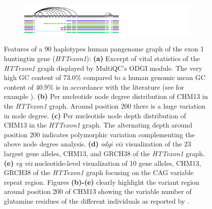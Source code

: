\begin{figure}[ht!]
\begin{subfigure}{\linewidth}
	\caption{}
	\centering
	\includegraphics[width=1.0\linewidth, trim=-0.4cm 0.1cm 3.15cm 0cm, clip]{fig/metrics/chr4_pan_HTTex1_STR_xg_svg.pdf}
	\label{fig:metrics-str}
\end{subfigure}
	\caption{Features of a 90 haplotypes human pangenome graph of the exon 1 huntingtin gene (\textit{HTTexon1}): \textbf{(a)} Excerpt of vital statistics of the \textit{HTTexon1} graph displayed by MultiQC's ODGI module. The very high GC content of 73.0\% compared to a human genomic mean GC content of 40.9\% \cite{Piovesan2019} is in accordance with the literature (see for example \cite{Sathasivam2013, Neueder2017}). \textbf{(b)} Per nucleotide node degree distribution of CHM13 in the \textit{HTTexon1} graph. Around position 200 there is a huge variation in node degree. \textbf{(c)} Per nucleotide node depth distribution of CHM13 in the \textit{HTTexon1} graph. The alternating depth around position 200 indicates polymorphic variation complementing the above node degree analysis. \textbf{(d)} \textit{odgi viz} visualization of the 23 largest gene alleles, CHM13, and GRCH38 of the \textit{HTTexon1} graph. \textbf{(e)} \textit{vg viz} nucleotide-level visualization of 10 gene alleles, CHM13, GRCH38 of the \textit{HTTexon1} graph focusing on the CAG variable repeat region. Figures \textbf{(b)-(e)} clearly highlight the variant region around position 200 of CHM13 showing the variable number of glutamine residues of the different individuals as reported by \cite{Nance1999}.}
	\label{fig:metrics}
\end{figure}
